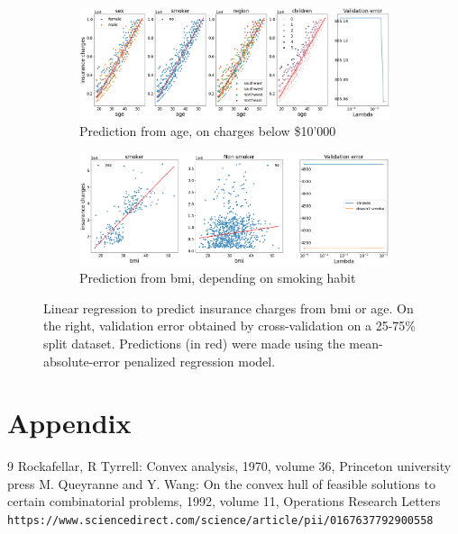 \documentclass[10pt]{article}
\newenvironment{exercise}[2][Exercise]{\begin{trivlist}
  \item[\hskip \labelsep {\bfseries #1}\hskip \labelsep {\bfseries #2.}]}{\end{trivlist}}
\begin{document}
\begin{exercise}{8}
\begin{figure}[!ht]
     \centering
     \begin{subfigure}[b]{1\textwidth}
         \centering
         \includegraphics[width=\textwidth]{doc/images/age_cluster.png}
         \caption{Prediction from age, on charges below \$10'000}
         \label{fig:age-cluster-1}
     \end{subfigure}
         \hfill
     \begin{subfigure}[b]{1\textwidth}
         \centering
         \includegraphics[width=\textwidth]{doc/images/smokes_clusters.png}
         \caption{Prediction from bmi, depending on smoking habit}
         \label{fig:bmi-cluster-1}
     \end{subfigure}
        \caption{Linear regression to predict insurance charges from bmi or age. On the right, validation error obtained by cross-validation on a 25-75\% split dataset. Predictions (in red) were made using the mean-absolute-error penalized regression model. }
        \label{fig:age-bmi-clusters}
\end{figure}


\end{exercise}


\newpage  
  \section*{Appendix}
 \begin{thebibliography}{9}
Rockafellar, R Tyrrell: Convex analysis, 1970, volume 36, Princeton university press
M. Queyranne and Y. Wang: On the convex hull of feasible solutions to certain combinatorial problems, 1992, volume 11, Operations Research Letters
\\\texttt{https://www.sciencedirect.com/science/article/pii/0167637792900558}
\end{thebibliography}
 
\end{document}
